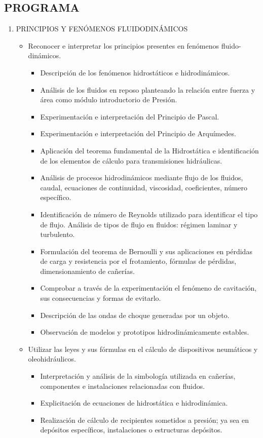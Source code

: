 \documentclass[planificacion.tex]{subfiles}
\begin{document}
\subsection*{\centering PROGRAMA \ano}

\begin{enumerate}
    \item PRINCIPIOS Y FENÓMENOS FLUIDODINÁMICOS 
    \begin{itemize}
        \item Reconocer e interpretar los
principios presentes en
fenómenos fluido-dinámicos.
        \begin{itemize}
            \item Descripción de los fenómenos hidrostáticos e
hidrodinámicos.
\item Análisis de los fluidos en reposo planteando la
relación entre fuerza y área como módulo introductorio
de Presión.
\item Experimentación e interpretación del Principio de
Pascal.
\item Experimentación e interpretación del Principio de
Arquímedes.
\item Aplicación del teorema fundamental de la Hidrostática
e identificación de los elementos de cálculo para
transmisiones hidráulicas.
\item Análisis de procesos hidrodinámicos mediante flujo de
los fluidos, caudal, ecuaciones de continuidad,
viscosidad, coeficientes, número específico.
\item Identificación de número de Reynolds utilizado para
identificar el tipo de flujo. 
Análisis de tipos de flujo en fluidos: régimen laminar y
turbulento.
\item Formulación del teorema de Bernoulli y sus
aplicaciones en pérdidas de carga y resistencia por el
frotamiento, fórmulas de pérdidas, dimensionamiento
de cañerías.
\item Comprobar a través de la experimentación el
fenómeno de cavitación, sus consecuencias y formas
de evitarlo.
\item Descripción de las ondas de choque generadas por un
objeto.
\item Observación de modelos y prototipos
hidrodinámicamente estables. 
        \end{itemize}
        \item Utilizar las leyes y sus fórmulas
en el cálculo de dispositivos
neumáticos y oleohidráulicos.
        \begin{itemize}
            \item  Interpretación y análisis de la simbología utilizada en cañerías, componentes e instalaciones relacionadas con fluidos.
    \item Explicitación de ecuaciones de hidrostática e hidrodinámica.
        \item Realización de cálculo de recipientes sometidos a
presión; ya sea en depósitos específicos, instalaciones
o estructuras depósitos.
      \end{itemize}
    

\end{itemize}
\end{enumerate}
\end{document}
